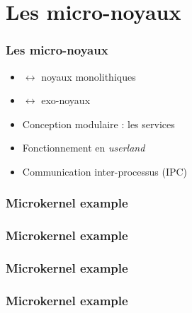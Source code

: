 \section{Les micro-noyaux}


\begin{frame}
  \frametitle{Les micro-noyaux}

  \begin{itemize}
  \item
    $\leftrightarrow$ noyaux monolithiques
  \item
    $\leftrightarrow$ exo-noyaux
  \item
    Conception modulaire : les services
  \item
    Fonctionnement en \emph{userland}
  \item
    Communication inter-processus (IPC)
  \end{itemize}

\end{frame}


\begin{frame}
  \frametitle{Microkernel example}

  \begin{center}
  \end{center}
\end{frame}


\begin{frame}
  \frametitle{Microkernel example}

  \begin{center}
  \end{center}
\end{frame}


\begin{frame}
  \frametitle{Microkernel example}

  \begin{center}
  \end{center}
\end{frame}


\begin{frame}
  \frametitle{Microkernel example}

  \begin{center}
  \end{center}
\end{frame}

